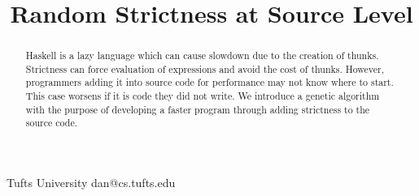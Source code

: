 \documentclass{sigplanconf}
\begin{document}
\lstset{language=Haskell,basicstyle=\ttfamily,captionpos=b}

\setlength{\pdfpageheight}{\paperheight}
\setlength{\pdfpagewidth}{\paperwidth}





\title{Random Strictness at Source Level}

           {Tufts University}
           {dan@cs.tufts.edu}

\maketitle

\begin{abstract}
Haskell is a lazy language which can cause slowdown due to the creation of thunks. Strictness can force evaluation of expressions and avoid the cost of thunks. However, programmers adding it into source code for performance may not know where to start. This case worsens if it is code they did not write. We introduce a genetic algorithm with the purpose of developing a faster program through adding strictness to the source code.
\end{abstract}



\end{document}
